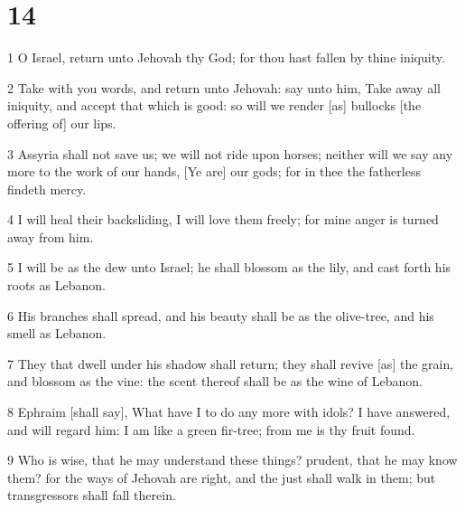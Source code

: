 \chapter{14}

\par 1 O Israel, return unto Jehovah thy God; for thou hast fallen by thine iniquity.
\par 2 Take with you words, and return unto Jehovah: say unto him, Take away all iniquity, and accept that which is good: so will we render [as] bullocks [the offering of] our lips.
\par 3 Assyria shall not save us; we will not ride upon horses; neither will we say any more to the work of our hands, [Ye are] our gods; for in thee the fatherless findeth mercy.
\par 4 I will heal their backsliding, I will love them freely; for mine anger is turned away from him.
\par 5 I will be as the dew unto Israel; he shall blossom as the lily, and cast forth his roots as Lebanon.
\par 6 His branches shall spread, and his beauty shall be as the olive-tree, and his smell as Lebanon.
\par 7 They that dwell under his shadow shall return; they shall revive [as] the grain, and blossom as the vine: the scent thereof shall be as the wine of Lebanon.
\par 8 Ephraim [shall say], What have I to do any more with idols? I have answered, and will regard him: I am like a green fir-tree; from me is thy fruit found.
\par 9 Who is wise, that he may understand these things? prudent, that he may know them? for the ways of Jehovah are right, and the just shall walk in them; but transgressors shall fall therein.

